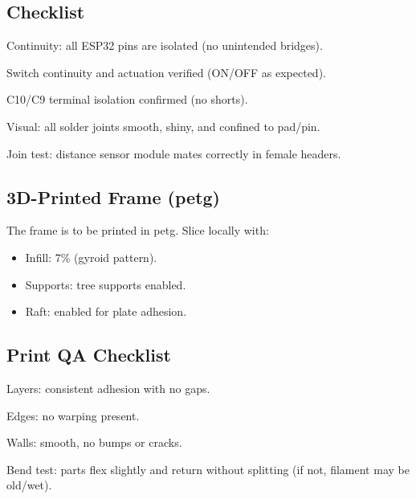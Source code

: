 \begin{manualblock}
\subsection*{Checklist}
\checkbox{} Continuity: all ESP32 pins are isolated (no unintended bridges).

\checkbox{} Switch continuity and actuation verified (ON/OFF as expected).

\checkbox{} C10/C9 terminal isolation confirmed (no shorts).

\checkbox{} Visual: all solder joints smooth, shiny, and confined to pad/pin.

\checkbox{} Join test: distance sensor module mates correctly in female headers.

\subsection*{3D-Printed Frame (\gls{petg})}
The frame is to be printed in \gls{petg}. Slice locally with:
\begin{itemize}
  \item Infill: 7\% (gyroid pattern).
  \item Supports: tree supports enabled.
  \item Raft: enabled for plate adhesion.
\end{itemize}

\subsection*{Print QA Checklist}
\checkbox{} Layers: consistent adhesion with no gaps.

\checkbox{} Edges: no warping present.

\checkbox{} Walls: smooth, no bumps or cracks.

\checkbox{} Bend test: parts flex slightly and return without splitting (if not, filament may be old/wet).


\end{manualblock}
